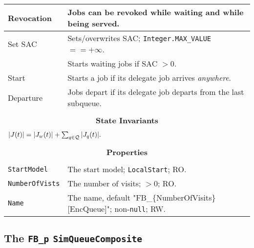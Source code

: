 \begin{tabular}{|l|l|}
	\hline
	Revocation & Jobs can be revoked while waiting and while being served. \\
	\hline
	Set SAC & Sets/overwrites SAC; \lstinline|Integer.MAX_VALUE| $== +\infty$. \\
	& Starts waiting jobs if SAC $> 0$. \\
	\hline
	Start & Starts a job if its delegate job arrives {\em anywhere}. \\
	\hline
	Departure & Jobs depart if its delegate job departs from the last subqueue. \\
	\hline
	\multicolumn{2}{|c|}{} \\
	\multicolumn{2}{|c|}{\bf State  Invariants} \\
	\multicolumn{2}{|c|}{} \\
	\hline
	\multicolumn{2}{|l|}{$|J(t)| = |J_{w}(t)| + \sum_{q \in \cal{Q}} |J_{q}(t)|.$} \\
	\hline
	\multicolumn{2}{|c|}{} \\
	\multicolumn{2}{|c|}{\bf Properties} \\
	\multicolumn{2}{|c|}{} \\
	\hline
	\lstinline|StartModel| & The start model; \lstinline|LocalStart|; RO. \\
	\hline
	\lstinline|NumberOfVists|    & The number of visits; $>0$; RO. \\
	\hline
	\lstinline|Name|       & The name, default "FB\_\{NumberOfVisits\}[EncQueue]"; non-\lstinline|null|; RW. \\
	\hline
\end{tabular}

\subsection{The \lstinline{FB_p} \lstinline{SimQueueComposite}}
\label{sec:FB_p}

